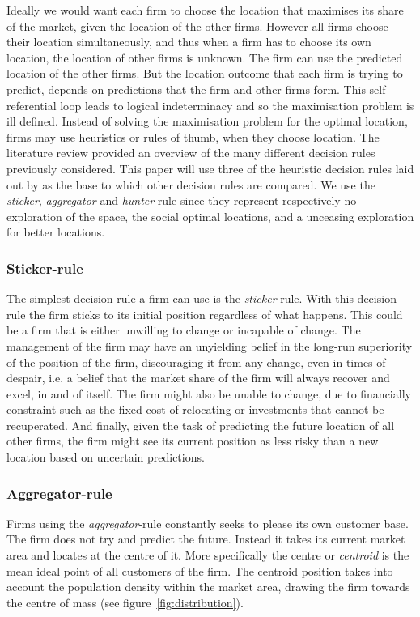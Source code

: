 \documentclass[preprint, 12pt]{elsarticle}
\begin{document}
Ideally we would want each firm to choose the location that maximises its share of the market, given the location of the other firms. However all firms choose their location simultaneously, and thus when a firm has to choose its own location, the location of other firms is unknown. The firm can use the predicted location of the other firms. But the location outcome that each firm is trying to predict, depends on predictions that the firm and other firms form. This self-referential loop leads to logical indeterminacy and so the maximisation problem is ill defined. Instead of solving the maximisation problem for the optimal location, firms may use heuristics or rules of thumb, when they choose location. The literature review provided an overview of the many different decision rules previously considered. This paper will use three of the heuristic decision rules laid out by \citet{Laver_Sergenti_2011} as the base to which other decision rules are compared. We use the \emph{sticker}, \emph{aggregator} and \emph{hunter}-rule since they represent respectively no exploration of the space, the social optimal locations, and a unceasing exploration for better locations.

\subsubsection{Sticker-rule}

The simplest decision rule a firm can use is the \emph{sticker}-rule. With this decision rule the firm sticks to its initial position regardless of what happens. This could be a firm that is either unwilling to change or incapable of change. The management of the firm may have an unyielding belief in the long-run superiority of the position of the firm, discouraging it from any change, even in times of despair, i.e. a belief that the market share of the firm will always recover and excel, in and of itself. The firm might also be unable to change, due to financially constraint such as the fixed cost of relocating or investments that cannot be recuperated. And finally, given the task of predicting the future location of all other firms, the firm might see its current position as less risky than a new location based on uncertain predictions.

\subsubsection{Aggregator-rule}

Firms using the \emph{aggregator}-rule constantly seeks to please its own customer base. The firm does not try and predict the future. Instead it takes its current market area and locates at the centre of it. More specifically the centre or \emph{centroid} is the mean ideal point of all customers of the firm. The centroid position takes into account the population density within the market area, drawing the firm towards the centre of mass (see figure~\ref{fig:distribution}).
\end{document}

